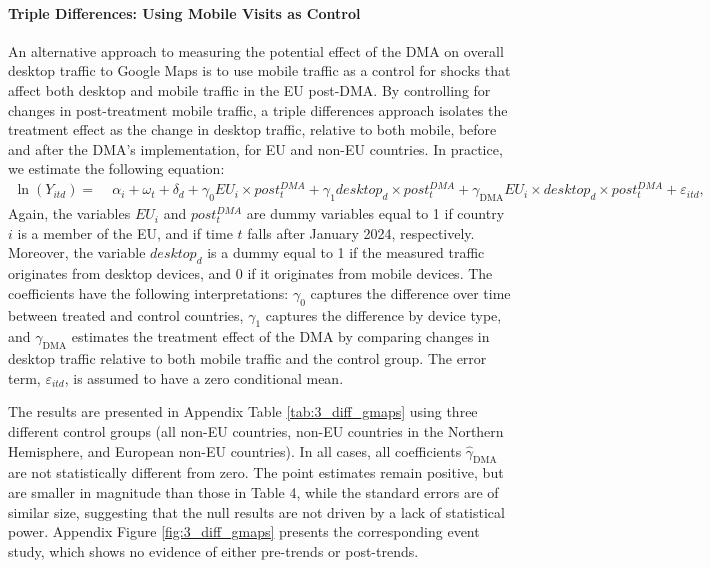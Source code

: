 \documentclass[11pt]{article}
\begin{document}
	\paragraph{Triple Differences: Using Mobile Visits as Control}  An alternative approach to measuring the potential effect of the DMA on overall desktop traffic to Google Maps is to use mobile traffic as a control for shocks that affect both desktop and mobile traffic in the EU post-DMA. By controlling for changes in post-treatment mobile traffic, a triple differences approach isolates the treatment effect as the change in desktop traffic, relative to both mobile, before and after the DMA's implementation, for EU and non-EU countries. In practice, we estimate the following equation:
	\begin{align} \label{eq:ddd}
		\ln \left( Y_{itd} \right)
		= & \; \alpha_i + \omega_t + \delta_d  + \gamma_{0} EU_i\times post^{DMA}_t + \gamma_{1} desktop_d \times post^{DMA}_t + \gamma_{\mathrm{DMA}} EU_i \times desktop_d \times post^{DMA}_t + \varepsilon_{itd},
	\end{align}
	Again, the variables $EU_i$ and $post_t^{DMA}$ are dummy variables equal to 1 if country $i$ is a member of the EU, and if time $t$ falls after January 2024, respectively. Moreover, the variable $desktop_d$ is a dummy equal to 1 if the measured traffic originates from desktop devices, and 0 if it originates from mobile devices. The coefficients have the following interpretations: $\gamma_0$ captures the difference over time between treated and control countries, $\gamma_1$ captures the difference by device type, and $\gamma_{\mathrm{DMA}}$ estimates the treatment effect of the DMA by comparing changes in desktop traffic relative to both mobile traffic and the control group. The error term, $ \varepsilon_{itd}$, is assumed to have a zero conditional mean.
	
	The results are presented in Appendix Table \ref{tab:3_diff_gmaps} using three different control groups (all non-EU countries, non-EU countries in the Northern Hemisphere, and European non-EU countries). In all cases, all coefficients $\hat{\gamma}_{\mathrm{DMA}}$ are not statistically different from zero. The point estimates remain positive, but are smaller in magnitude than those in Table 4, while the standard errors are of similar size, suggesting that the null results are not driven by a lack of statistical power. Appendix Figure \ref{fig:3_diff_gmaps} presents the corresponding event study, which shows no evidence of either pre-trends or post-trends.
	
\end{document}
